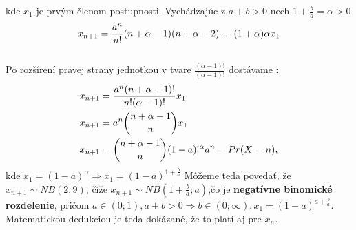 \documentclass[a4paper,10pt]{article}
\theoremstyle{plain}
\theoremstyle{definition}
\begin{document}
\noindent kde $ x_{1} $ je prvým členom postupnosti. \newpage
\noindent Vychádzajúc z $ a + b > 0 $ nech $ 1 + \frac{b}{a} = \alpha > 0$\\
$$ x_{n+1} = \frac{a^{n}}{n!}\*(n+\alpha-1)\*(n+\alpha-2) \ldots (1+\alpha)\*\alpha\*x_{1}$$\\
Po rozšírení pravej strany jednotkou v tvare $ \frac{(\alpha-1)!}{(\alpha-1)!} $ dostávame : 
\begin{align*}
x_{n+1} &= \frac{a^{n}\*(n+\alpha-1)!}{n!\*(\alpha-1)!}\*x_{1} \\
x_{n+1} &= a^{n}\* \dbinom{n+\alpha-1}{n}\*x_{1} \\	%
x_{n+1} &= \dbinom{n+\alpha-1}{n}\*(1-a)!^{\alpha}\*a^{n} = Pr(X = n) ,
\end{align*}
\noindent kde $ x_{1} = (1-a)^{\alpha} \Rightarrow x_{1} = (1-a)^{1+\frac{b}{a}}$ 
Môžeme teda povedať, že $ x_{n+1} \sim NB(2,9) $, číže $ x_{n+1}\sim NB (1+\frac{b}{a}; a) $,čo je \textbf{negatívne binomické rozdelenie}, pričom
$ a \in (0;1), a+b>0 \Rightarrow b \in (0;\infty), x_{1}=(1-a)^{a+\frac{b}{a}}$. Matematickou dedukciou je teda dokázané, že to platí aj pre 
$ x_{n} $.\\
\end{document}
